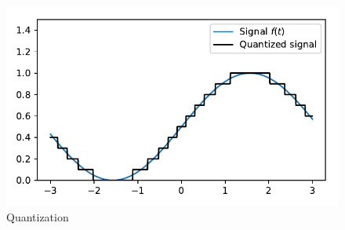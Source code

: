 \begin{frame}
\begin{columns}[c, onlytextwidth]
\begin{column}{0.6\textwidth}
{                \begin{figure}[]
                    \centering
                    \includegraphics[height=0.5\textheight]{images/quantization_t.pdf}
                    \caption{Quantization}
                \end{figure}
            }
        \end{column}
    \end{columns}


\end{frame}


